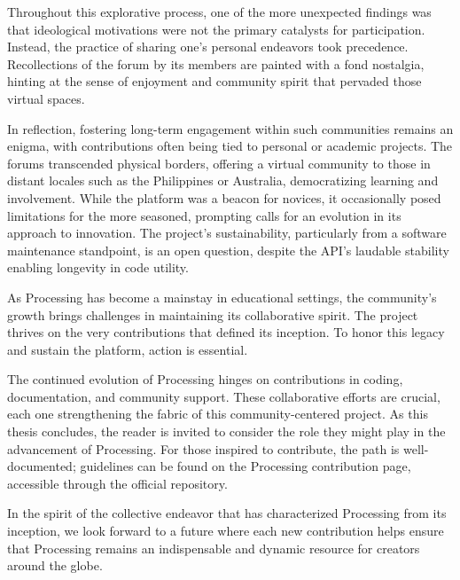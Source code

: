 Throughout this explorative process, one of the more unexpected findings was that ideological motivations were not the primary catalysts for participation. Instead, the practice of sharing one's personal endeavors took precedence. Recollections of the forum by its members are painted with a fond nostalgia, hinting at the sense of enjoyment and community spirit that pervaded those virtual spaces.

In reflection, fostering long-term engagement within such communities remains an enigma, with contributions often being tied to personal or academic projects. The forums transcended physical borders, offering a virtual community to those in distant locales such as the Philippines or Australia, democratizing learning and involvement. While the platform was a beacon for novices, it occasionally posed limitations for the more seasoned, prompting calls for an evolution in its approach to innovation. The project’s sustainability, particularly from a software maintenance standpoint, is an open question, despite the API’s laudable stability enabling longevity in code utility.

As Processing has become a mainstay in educational settings, the community's growth brings challenges in maintaining its collaborative spirit. The project thrives on the very contributions that defined its inception. To honor this legacy and sustain the platform, action is essential.

The continued evolution of Processing hinges on contributions in coding, documentation, and community support. These collaborative efforts are crucial, each one strengthening the fabric of this community-centered project. As this thesis concludes, the reader is invited to consider the role they might play in the advancement of Processing. For those inspired to contribute, the path is well-documented; guidelines can be found on the Processing contribution page, accessible through the official repository.

In the spirit of the collective endeavor that has characterized Processing from its inception, we look forward to a future where each new contribution helps ensure that Processing remains an indispensable and dynamic resource for creators around the globe.
